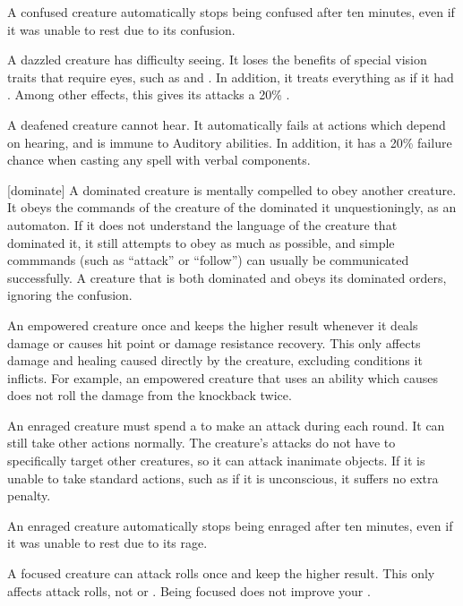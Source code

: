   A confused creature automatically stops being confused after ten minutes, even if it was unable to rest due to its confusion.

   A dazzled creature has difficulty seeing.
  It loses the benefits of special vision traits that require eyes, such as  and .
  In addition, it treats everything as if it had .
  Among other effects, this gives its  attacks a 20\% .

   A deafened creature cannot hear.
  It automatically fails at actions which depend on hearing, and is immune to Auditory abilities.
  In addition, it has a 20\% failure chance when casting any spell with verbal components.

  [dominate] A dominated creature is mentally compelled to obey another creature.
  It obeys the commands of the creature of the dominated it unquestioningly, as an automaton.
  If it does not understand the language of the creature that dominated it, it still attempts to obey as much as possible, and simple commmands (such as ``attack'' or ``follow'') can usually be communicated successfully.
  A creature that is both dominated and \confused obeys its dominated orders, ignoring the confusion.

   An empowered creature  once and keeps the higher result whenever it deals damage or causes hit point or damage resistance recovery.
  This only affects damage and healing caused directly by the creature, excluding conditions it inflicts.
  For example, an empowered creature that uses an ability which causes  does not roll the damage from the knockback twice.

   An enraged creature must spend a  to make an attack during each round.
  It can still take other actions normally.
  The creature's attacks do not have to specifically target other creatures, so it can attack inanimate objects.
  If it is unable to take standard actions, such as if it is unconscious, it suffers no extra penalty.

  An enraged creature automatically stops being enraged after ten minutes, even if it was unable to rest due to its rage.

   A focused creature can  attack rolls once and keep the higher result.
  This only affects attack rolls, not  or .
  Being focused does not improve your .

